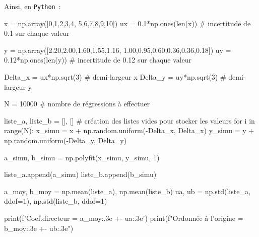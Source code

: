\documentclass[a4paper, 12pt, garamond]{book}
\begin{document}
Ainsi, en \texttt{Python}~:
\begin{python}
x = np.array([0,1,2,3,4, 5,6,7,8,9,10])
ux = 0.1*np.ones(len(x))   # incertitude de 0.1 sur chaque valeur

y = np.array([2.20,2.00,1.60,1.55,1.16, 1.00,0.95,0.60,0.36,0.36,0.18])
uy = 0.12*np.ones(len(y))  # incertitude de 0.12 sur chaque valeur

Delta_x = ux*np.sqrt(3)    # demi-largeur x
Delta_y = uy*np.sqrt(3)    # demi-largeur y

N = 10000                  # nombre de régressions à effectuer

liste_a, liste_b = [], []  # création des listes vides pour stocker les valeurs
for i in range(N):
x_simu = x + np.random.uniform(-Delta_x, Delta_x)
y_simu = y + np.random.uniform(-Delta_y, Delta_y)

a_simu, b_simu = np.polyfit(x_simu, y_simu, 1)

liste_a.append(a_simu)
liste_b.append(b_simu)

a_moy, b_moy = np.mean(liste_a), np.mean(liste_b)
ua, ub = np.std(liste_a, ddof=1), np.std(liste_b, ddof=1)

print(f'Coef.directeur = {a_moy:.3e} +- {ua:.3e}')
print(f"Ordonnée à l'origine = {b_moy:.3e} +- {ub:.3e}")
\end{python}
\end{document}
